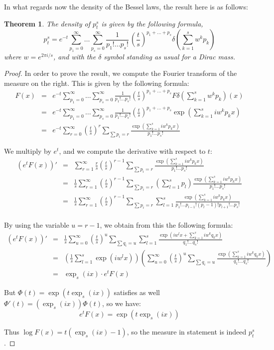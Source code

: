 \documentclass[12pt]{amsbook}
\newtheorem{theorem}{Theorem}[chapter]
\begin{document}
In what regards now the density of the Bessel laws, the result here is as follows:

\begin{theorem}
The density of $p^s_t$ is given by the following formula,
$$p^s_t=e^{-t}\sum_{p_1=0}^\infty\ldots\sum_{p_s=0}^\infty\frac{1}{p_1!\ldots p_s!}\,\left(\frac{t}{s}\right)^{p_1+\ldots+p_s}\delta\left(\sum_{k=1}^sw^kp_k\right)$$
where $w=e^{2\pi i/s}$, and with the $\delta$ symbol standing as usual for a Dirac mass.
\end{theorem}

\begin{proof}
In order to prove the result, we compute the Fourier transform of the measure on the right. This is given by the following formula:
\begin{eqnarray*}
F(x)
&=&e^{-t}\sum_{p_1=0}^\infty\ldots\sum_{p_s=0}^\infty\frac{1}{p_1!\ldots p_s!}\left(\frac{t}{s}\right)^{p_1+\ldots+p_s}F\delta\left(\sum_{k=1}^sw^kp_k\right)(x)\\
&=&e^{-t}\sum_{p_1=0}^\infty\ldots\sum_{p_s=0}^\infty\frac{1}{p_1!\ldots p_s!}\left(\frac{t}{s}\right)^{p_1+\ldots+p_s}\exp\left(\sum_{k=1}^siw^kp_kx\right)\\
&=&e^{-t}\sum_{r=0}^\infty\left(\frac{t}{s}\right)^r\sum_{\sum p_i=r}\frac{\exp\left(\sum_{k=1}^siw^kp_kx\right)}{p_1!\ldots p_s!}
\end{eqnarray*}

We multiply by $e^t$, and we compute the derivative with respect to $t$:
\begin{eqnarray*}
(e^tF(x))'
&=&\sum_{r=1}^\infty\frac{r}{s}\left(\frac{t}{s}\right)^{r-1}\sum_{\sum p_i=r}\frac{\exp\left(\sum_{k=1}^siw^kp_kx\right)}{p_1!\ldots p_s!}\\
&=&\frac{1}{s}\sum_{r=1}^\infty\left(\frac{t}{s}\right)^{r-1}\sum_{\sum p_i=r}\left(\sum_{l=1}^sp_l\right)\frac{\exp\left(\sum_{k=1}^siw^kp_kx\right)}{p_1!\ldots p_s!}\\
&=&\frac{1}{s}\sum_{r=1}^\infty\left(\frac{t}{s}\right)^{r-1}\sum_{\sum p_i=r}\sum_{l=1}^s\frac{\exp\left(\sum_{k=1}^siw^kp_kx\right)}{p_1!\ldots p_{l-1}!(p_l-1)!p_{l+1}!\ldots p_s!}\\
\end{eqnarray*}

By using the variable $u=r-1$, we obtain from this the following formula:
\begin{eqnarray*}
(e^tF(x))'
&=&\frac{1}{s}\sum_{u=0}^\infty\left(\frac{t}{s}\right)^u\sum_{\sum q_i=u}\sum_{l=1}^s\frac{\exp\left(iw^lx+\sum_{k=1}^siw^kq_kx\right)}{q_1!\ldots q_s!}\\
&=&\left(\frac{1}{s}\sum_{l=1}^s\exp(iw^lx)\right)\left(\sum_{u=0}^\infty\left(\frac{t}{s}\right)^u\sum_{\sum q_i=u}\frac{\exp\left(\sum_{k=1}^siw^kq_kx\right)}{q_1!\ldots q_s!}\right)\\
&=&\exp_s(ix)\cdot e^tF(x)
\end{eqnarray*}

But $\Phi(t)=\exp(t\exp_s(ix))$ satisfies as well $\Phi'(t)=(\exp_s(ix))\Phi(t)$, so we have:
$$e^tF(x)=\exp(t\exp_s(ix))$$

Thus $\log F(x)=t(\exp_s(ix)-1)$, so the measure in statement is indeed $p^s_t$.
\end{proof}
\end{document}
